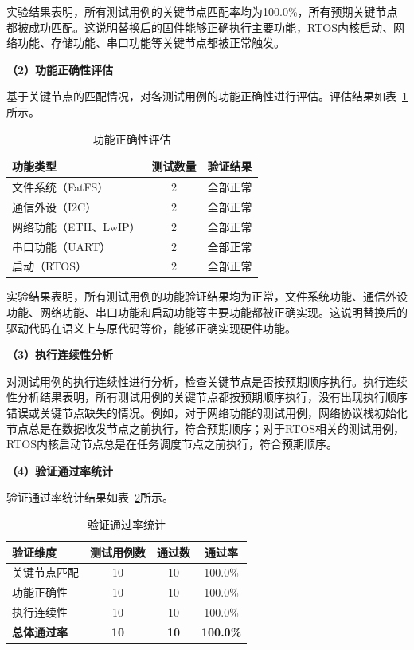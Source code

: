 实验结果表明，所有测试用例的关键节点匹配率均为100.0\%，所有预期关键节点都被成功匹配。这说明替换后的固件能够正确执行主要功能，RTOS内核启动、网络功能、存储功能、串口功能等关键节点都被正常触发。

\textbf{（2）功能正确性评估}

基于关键节点的匹配情况，对各测试用例的功能正确性进行评估。评估结果如表~\ref{tab:function_results}所示。

\begin{table}[htbp]
\centering
\caption{功能正确性评估}
\label{tab:function_results}
\begin{tabular}{lcc}
\toprule
\textbf{功能类型} & \textbf{测试数量} & \textbf{验证结果} \\
\midrule
文件系统（FatFS） & 2 & 全部正常 \\
通信外设（I2C） & 2 & 全部正常 \\
网络功能（ETH、LwIP） & 2 & 全部正常 \\
串口功能（UART） & 2 & 全部正常 \\
启动（RTOS） & 2 & 全部正常 \\
\bottomrule
\end{tabular}
\end{table}

实验结果表明，所有测试用例的功能验证结果均为正常，文件系统功能、通信外设功能、网络功能、串口功能和启动功能等主要功能都被正确实现。这说明替换后的驱动代码在语义上与原代码等价，能够正确实现硬件功能。

\textbf{（3）执行连续性分析}

对测试用例的执行连续性进行分析，检查关键节点是否按预期顺序执行。执行连续性分析结果表明，所有测试用例的关键节点都按预期顺序执行，没有出现执行顺序错误或关键节点缺失的情况。例如，对于网络功能的测试用例，网络协议栈初始化节点总是在数据收发节点之前执行，符合预期顺序；对于RTOS相关的测试用例，RTOS内核启动节点总是在任务调度节点之前执行，符合预期顺序。

\textbf{（4）验证通过率统计}

验证通过率统计结果如表~\ref{tab:pass_results}所示。

\begin{table}[htbp]
\centering
\caption{验证通过率统计}
\label{tab:pass_results}
\begin{tabular}{lccc}
\toprule
\textbf{验证维度} & \textbf{测试用例数} & \textbf{通过数} & \textbf{通过率} \\
\midrule
关键节点匹配 & 10 & 10 & 100.0\% \\
功能正确性 & 10 & 10 & 100.0\% \\
执行连续性 & 10 & 10 & 100.0\% \\
\textbf{总体通过率} & \textbf{10} & \textbf{10} & \textbf{100.0\%} \\
\bottomrule
\end{tabular}
\end{table}

